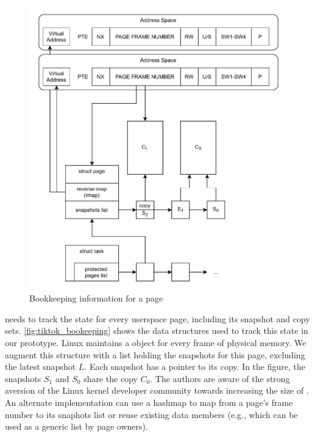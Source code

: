 \documentclass[letterpaper,twocolumn,10pt, anonymous]{article}
\begin{document}
\begin{figure}[]
  \includegraphics[width=\linewidth]{img/book-keeping.pdf}
  \caption{Bookkeeping information for a page}
  \label{fig:tiktok_bookeeping}
\end{figure}

\tiktok needs to track the state for every userspace page, including
its snapshot and copy sets.
\autoref{fig:tiktok_bookeeping} shows the data structures used to
track this state in our prototype.
Linux maintains a  object for every frame of 
physical memory. 
We augment this structure with a list holding the snapshots
for this page, excluding the latest snapshot $L$.
Each snapshot has a pointer to its copy. 
In the figure, the snapshots $S_1$ and $S_0$ share the copy $C_0$.
The authors are aware of the strong aversion of the 
Linux kernel developer community towards increasing the size of 
. 
An alternate implementation can use a hashmap to
map from a page's frame number to its snaphots list or
reuse existing data members (e.g.,  which 
can be used as a generic list by page owners).
\end{document}
